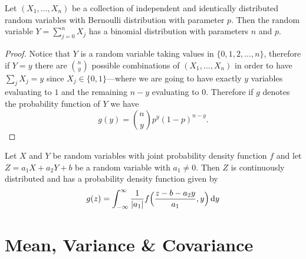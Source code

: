 \begin{proposition}
\label{prop:sum-bernoulli-rv-is-binomial}
Let \((X_1, \dots, X_n)\) be a collection of independent and identically
distributed random variables with Bernoulli distribution with parameter
\(p\). Then the random variable \(Y = \sum_{j=0}^n X_j\) has a binomial
distribution with parameters \(n\) and \(p\).
\end{proposition}

\begin{proof}
Notice that \(Y\) is a random variable taking values in
\(\{0, 1, 2, \dots, n\}\), therefore if \(Y = y\) there are \(\binom{n}{y}\)
possible combinations of \((X_1, \dots, X_n)\) in order to have
\(\sum_j X_j = y\) since \(X_j \in \{0, 1\}\)---where we are going to have
exactly \(y\) variables evaluating to \(1\) and the remaining \(n - y\)
evaluating to \(0\). Therefore if \(g\) denotes the probability function of
\(Y\) we have
\[
g(y) = \binom{n}{y} p^y (1 - p)^{n - y}.
\]
\end{proof}

\begin{proposition}
\label{prop:}
Let \(X\) and \(Y\) be random variables with joint probability density function
\(f\) and let \(Z = a_1 X + a_2 Y + b\) be a random variable with \(a_1 \neq
0\). Then \(Z\) is continuously distributed and has a probability density
function given by
\[
g(z) = \int_{-\infty}^{\infty} \frac{1}{|a_1|}
f\Big( \frac{z - b - a_{2}y}{a_1}, y \Big)\, \mathrm{d} y
\]
\end{proposition}

\section{Mean, Variance \& Covariance}

